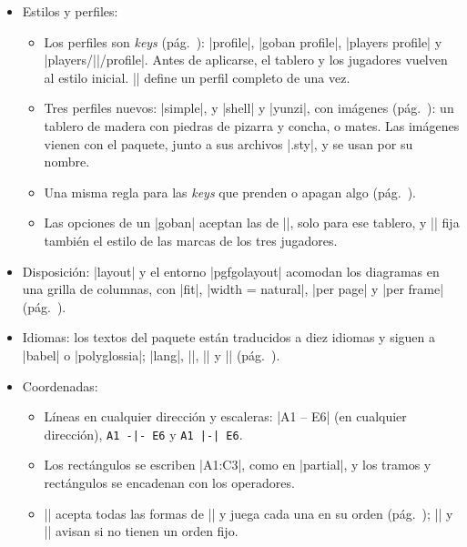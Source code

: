 \begin{itemize}
\begin{itemize}
\begin{itemize}
					\item El sistema de coordenadas |go| de \tikzname: |(go cs:C3)| (pág.~\pageref{subsec:tikz}).
				\end{itemize}
			\item Estilos y perfiles:
				\begin{itemize}
					\item Los perfiles son \emph{keys} (pág.~\pageref{subsec:perfiles}): |profile|, |goban profile|, |players profile| y |players/||/profile|. Antes de aplicarse, el tablero y los jugadores vuelven al estilo inicial. |\pgfgodefineprofile| define un perfil completo de una vez.
					\item Tres perfiles nuevos: |simple|, y |shell| y |yunzi|, con imágenes (pág.~\pageref{subsec:perfilshell}): un tablero de madera con piedras de pizarra y concha, o mates. Las imágenes vienen con el paquete, junto a sus archivos |.sty|, y se usan por su nombre.
					\item Una misma regla para las \emph{keys} que prenden o apagan algo (pág.~\pageref{subsec:prender}).
					\item Las opciones de un |goban| aceptan las de |\pgfgoset|, solo para ese tablero, y || fija también el estilo de las marcas de los tres jugadores.
				\end{itemize}
			\item Disposición: |layout| y el entorno |pgfgolayout| acomodan los diagramas en una grilla de columnas, con |fit|, |width = natural|, |per page| y |per frame| (pág.~\pageref{subsec:disposicion}).
			\item Idiomas: los textos del paquete están traducidos a diez idiomas y siguen a |babel| o |polyglossia|; |lang|, |\pgfgotext|, |\pgfgodefinelanguage| y |\pgfgolanguagealias| (pág.~\pageref{subsec:idiomas}).
			\item Coordenadas:
				\begin{itemize}
					\item Líneas en cualquier dirección y escaleras: |A1 -- E6| (en cualquier dirección), \verb+A1 -|- E6+ y \verb+A1 |-| E6+.
					\item Los rectángulos se escriben |A1:C3|, como en |partial|, y los tramos y rectángulos se encadenan con los operadores.
					\item |\moves| acepta todas las formas de |\stones| y juega cada una en su orden (pág.~\pageref{subsec:orden-coordenadas}); |\moves| y |\marks[sequence]| avisan si no tienen un orden fijo.
				\end{itemize}

\end{itemize}
\end{itemize}
